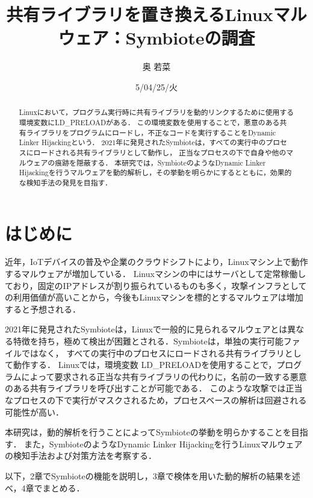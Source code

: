 \documentclass[submit,techreq,noauthor]{eco}	%
\begin{document}
\date   {5/04/25/火}				%
\title  {共有ライブラリを置き換えるLinuxマルウェア：Symbioteの調査}	%
\author {奥 若菜}				%


\begin{abstract}
	Linuxにおいて，プログラム実行時に共有ライブラリを動的リンクするために使用する環境変数にLD\_PRELOADがある．
  この環境変数を使用することで，悪意のある共有ライブラリをプログラムにロードし，不正なコードを実行することをDynamic Linker Hijackingという．
  2021年に発見されたSymbioteは，すべての実行中のプロセスにロードされる共有ライブラリとして動作し，
  正当なプロセスの下で自身や他のマルウェアの痕跡を隠蔽する．
  本研究では，SymbioteのようなDynamic Linker Hijackingを行うマルウェアを動的解析し，その挙動を明らかにするとともに，効果的な検知手法の発見を目指す．

\end{abstract}
\maketitle


\section{はじめに}
近年，IoTデバイスの普及や企業のクラウドシフトにより，Linuxマシン上で動作するマルウェアが増加している．
Linuxマシンの中にはサーバとして定常稼働しており，固定のIPアドレスが割り振られているものも多く，攻撃インフラとしての利用価値が高いことから，今後もLinuxマシンを標的とするマルウェアは増加すると予想される．

2021年に発見されたSymbioteは，Linuxで一般的に見られるマルウェアとは異なる特徴を持ち，極めて検出が困難とされる．Symbioteは，単独の実行可能ファイルではなく，
すべての実行中のプロセスにロードされる共有ライブラリとして動作する．
Linuxでは，環境変数 LD\_PRELOADを使用することで，プログラムによって要求される正当な共有ライブラリの代わりに，名前の一致する悪意のある共有ライブラリを呼び出すことが可能である．
このような攻撃では正当なプロセスの下で実行がマスクされるため，プロセスベースの解析は回避される可能性が高い．

本研究は，動的解析を行うことによってSymbioteの挙動を明らかすることを目指す．
また，SymbioteのようなDynamic Linker Hijackingを行うLinuxマルウェアの検知手法および対策方法を考察する．


以下，2章でSymbioteの機能を説明し，3章で検体を用いた動的解析の結果を述べ，4章でまとめる．\\
\end{document}
